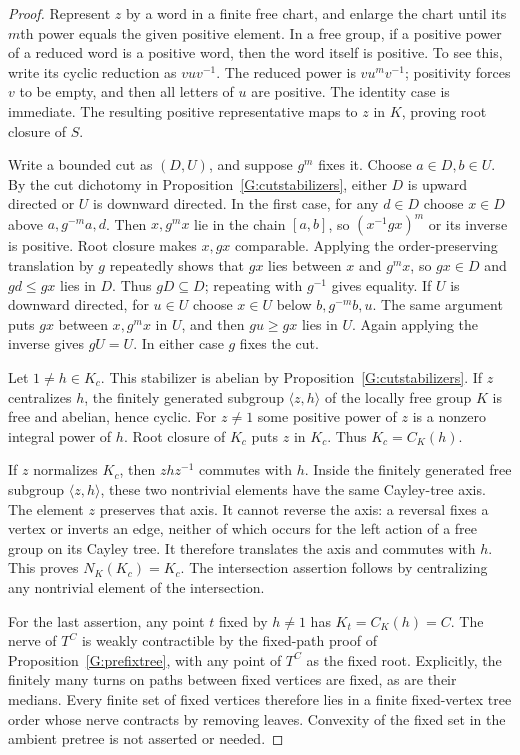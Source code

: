 \begin{proof}
Represent $z$ by a word in a finite free chart, and enlarge the
chart until its $m$th power equals the given positive element.
In a free group, if a positive power of a reduced word is a
positive word, then the word itself is positive. To see this,
write its cyclic reduction as $vuv^{-1}$. The reduced power is
$vu^mv^{-1}$; positivity forces $v$ to be empty, and then all
letters of $u$ are positive. The identity case is immediate.
The resulting positive representative maps to $z$ in $K$,
proving root closure of $S$.

Write a bounded cut as $(D,U)$, and suppose $g^m$ fixes it.
Choose $a\in D,b\in U$. By the cut dichotomy in
Proposition~\ref{G:cutstabilizers}, either $D$ is upward
directed or $U$ is downward directed. In the first case,
for any $d\in D$ choose $x\in D$ above $a,g^{-m}a,d$.
Then $x,g^m x$ lie in the chain $[a,b]$, so
$(x^{-1}gx)^m$ or its inverse is positive. Root closure
makes $x,gx$ comparable. Applying the order-preserving
translation by $g$ repeatedly shows that $gx$ lies between
$x$ and $g^m x$, so $gx\in D$ and $gd\le gx$ lies in $D$.
Thus $gD\subseteq D$; repeating with $g^{-1}$ gives equality.
If $U$ is downward directed, for $u\in U$ choose $x\in U$
below $b,g^{-m}b,u$. The same argument puts $gx$ between
$x,g^m x$ in $U$, and then $gu\ge gx$ lies in $U$.
Again applying the inverse gives $gU=U$. In either case
$g$ fixes the cut.

Let $1\ne h\in K_c$. This stabilizer is abelian by
Proposition~\ref{G:cutstabilizers}. If $z$ centralizes $h$,
the finitely generated subgroup $\langle z,h\rangle$ of the
locally free group $K$ is free and abelian, hence cyclic.
For $z\ne1$ some positive power of $z$ is a nonzero integral
power of $h$. Root closure of $K_c$ puts $z$ in $K_c$.
Thus $K_c=C_K(h)$.

If $z$ normalizes $K_c$, then $zhz^{-1}$ commutes with $h$.
Inside the finitely generated free subgroup $\langle z,h\rangle$,
these two nontrivial elements have the same Cayley-tree axis.
The element $z$ preserves that axis. It cannot reverse the axis:
a reversal fixes a vertex or inverts an edge, neither of which
occurs for the left action of a free group on its Cayley tree.
It therefore translates the axis and commutes with $h$.
This proves $N_K(K_c)=K_c$. The intersection assertion follows
by centralizing any nontrivial element of the intersection.

For the last assertion, any point $t$ fixed by $h\ne1$ has
$K_t=C_K(h)=C$. The nerve of $T^C$ is weakly contractible by
the fixed-path proof of Proposition~\ref{G:prefixtree}, with
any point of $T^C$ as the fixed root. Explicitly, the finitely
many turns on paths between fixed vertices are fixed, as are
their medians. Every finite set of fixed vertices therefore
lies in a finite fixed-vertex tree order whose nerve contracts
by removing leaves. Convexity of the fixed set in the ambient
pretree is not asserted or needed.
\end{proof}

